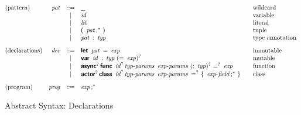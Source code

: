 \begin{figure*}

$$
\begin{array}{@{}lrcl@{\qquad}l}
\text{(pattern)} & \x{pat} &::=&
  \K\textunderscore
    & \text{wildcard} \\&&|&
  \x{id}
    & \text{variable} \\&&|&
  \x{lit}
    & \text{literal} \\&&|&
  \K(~\x{pat}\K,^\ast~\K)
    & \text{tuple} \\&&|&
  \x{pat}~\K:~\x{typ}
    & \text{type annotation} \\
[2ex]
\text{(declarations)} & \x{dec} &::=&
  \KK{let}~\x{pat}~\K=~\x{exp}
    & \text{immutable} \\&&|&
  \KK{var}~\x{id}~\K:~\x{typ}~(\K=~\x{exp})^?
    & \text{mutable} \\&&|&
  \KK{async}^?\, \KK{func}~\x{id}^? \x{typ-params}~\x{exp-params}~(\K:~\x{typ})^?~\K=^?~\x{exp}
    & \text{function} \\&&|&
  \KK{actor}^?\, \KK{class}~\x{id}^? \x{typ-params}~\x{exp-params}~\K=^?~\K\{~\x{exp-field}\K;^\ast~\K\}
    & \text{class} \\
[2ex]
\text{(program)} & \x{prog} &::=&
  \x{exp}\K;^\ast
\end{array}
$$

\caption{Abstract Syntax: Declarations}
\label{fig:syntax.dec}

\end{figure*}


